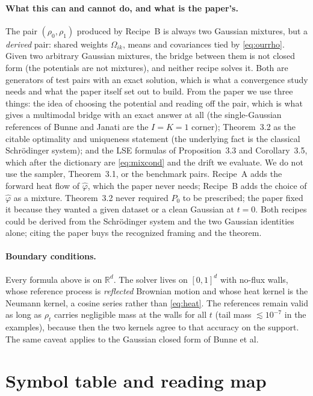 \documentclass[11pt]{article}
\newcommand{\R}{\mathbb{R}}
\newcommand{\hphi}{\hat\varphi}
\theoremstyle{definition}
\theoremstyle{plain}
\begin{document}
\paragraph{What this can and cannot do, and what is the paper's.}
The pair $(\rho_0,\rho_1)$ produced by Recipe~B is always two Gaussian mixtures, but a
\emph{derived} pair: shared weights $\Omega_{ik}$, means and covariances tied by
\eqref{eq:ourrho}. Given two arbitrary Gaussian mixtures, the bridge between them is not closed
form (the potentials are not mixtures), and neither recipe solves it. Both are generators of
test pairs with an exact solution, which is what a convergence study needs and what the paper
itself set out to build. From the paper we use three things: the idea of choosing the
potential and reading off the pair, which is what gives a multimodal bridge with an exact
answer at all (the single-Gaussian references of Bunne and Janati are the $I=K=1$ corner);
Theorem~3.2 as the citable optimality and uniqueness statement (the underlying fact is the
classical Schr\"odinger system); and the LSE formulas of Proposition~3.3 and Corollary~3.5,
which after the dictionary are \eqref{eq:mixcond} and the drift we evaluate. We do not use
the sampler, Theorem~3.1, or the benchmark pairs. Recipe~A adds the forward heat flow of
$\hphi$, which the paper never needs; Recipe~B adds the choice of $\hphi$ as a mixture.
Theorem~3.2 never required $P_0$ to be prescribed; the paper fixed it because they wanted a
given dataset or a clean Gaussian at $t=0$. Both recipes could be derived from the
Schr\"odinger system and the two Gaussian identities alone; citing the paper buys the
recognized framing and the theorem.

\paragraph{Boundary conditions.}
Every formula above is on $\R^d$. The solver lives on $[0,1]^d$ with no-flux walls, whose
reference process is \emph{reflected} Brownian motion and whose heat kernel is the Neumann
kernel, a cosine series rather than \eqref{eq:heat}. The references remain valid as long as
$\rho_t$ carries negligible mass at the walls for all $t$ (tail mass $\lesssim10^{-7}$ in the
examples), because then the two kernels agree to that accuracy on the support. The same
caveat applies to the Gaussian closed form of Bunne et al.

\section{Symbol table and reading map}
\label{sec:table}
\end{document}
